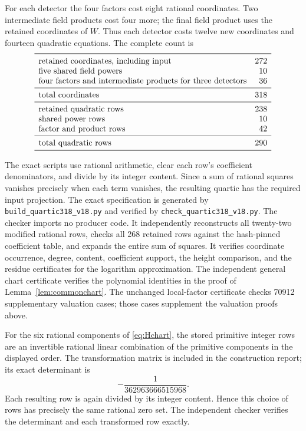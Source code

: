 \documentclass[11pt,a4paper]{article}
\theoremstyle{remark}\newtheorem{remark}[theorem]{Remark}
\begin{document}
For each detector the four factors cost eight rational coordinates.
Two intermediate field products cost four more; the final field
product uses the retained coordinates of $W$. Thus each detector
costs twelve new coordinates and fourteen quadratic equations.
The complete count is
\[
\begin{array}{lr}\toprule
\text{retained coordinates, including input}&272\\
\text{five shared field powers}&10\\
\text{four factors and intermediate products for three detectors}&36\\\midrule
\text{total coordinates}&318\\\midrule
\text{retained quadratic rows}&238\\
\text{shared power rows}&10\\
\text{factor and product rows}&42\\\midrule
\text{total quadratic rows}&290\\\bottomrule
\end{array}
\]

The exact scripts use rational arithmetic, clear each row's
coefficient denominators, and divide by its integer content. Since a
sum of rational squares vanishes precisely when each term vanishes,
the resulting quartic has the required input projection.
The exact specification is generated by
\nolinkurl{build_quartic318_v18.py} and verified by
\nolinkurl{check_quartic318_v18.py}. The checker imports no producer
code. It independently reconstructs all twenty-two modified rational
rows, checks all 268 retained rows against the hash-pinned coefficient
table, and expands the entire sum of squares. It verifies coordinate
occurrence, degree, content, coefficient support, the height comparison,
and the residue certificates for the logarithm approximation. The
independent general chart certificate verifies the polynomial identities
in the proof of Lemma~\ref{lem:commonchart}. The unchanged local-factor
certificate checks 70912 supplementary valuation cases; those cases
supplement the valuation proofs above.

For the six rational components of \eqref{eq:Hchart}, the stored
primitive integer rows are an invertible rational linear combination
of the primitive components in the displayed order. The transformation
matrix is included in the construction report; its exact determinant is
\[
                     -\frac1{362963666515968}.
\]
Each resulting row is again divided by its integer content. Hence this
choice of rows has precisely the same rational zero set. The independent
checker verifies the determinant and each transformed row exactly.
\end{document}
